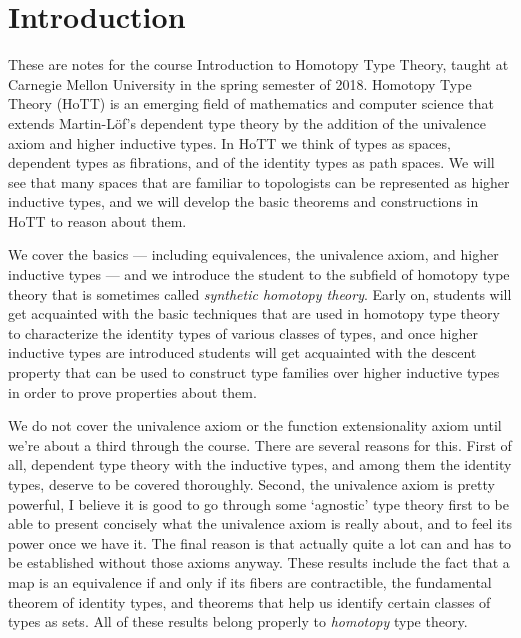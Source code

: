 \chapter{Introduction}
These are notes for the course Introduction to Homotopy Type Theory, taught at Carnegie Mellon University in the spring semester of 2018. Homotopy Type Theory (HoTT) is an emerging field of mathematics and computer science that extends Martin-Löf's dependent type theory by the addition of the univalence axiom and higher inductive types. In HoTT we think of types as spaces, dependent types as fibrations, and of the identity types as path spaces. We will see that many spaces that are familiar to topologists can be represented as higher inductive types, and we will develop the basic theorems and constructions in HoTT to reason about them.

We cover the basics --- including equivalences, the univalence axiom, and higher inductive types --- and we introduce the student to the subfield of homotopy type theory that is sometimes called \emph{synthetic homotopy theory}. Early on, students will get acquainted with the basic techniques that are used in homotopy type theory to characterize the identity types of various classes of types, and once higher inductive types are introduced students will get acquainted with the descent property that can be used to construct type families over higher inductive types in order to prove properties about them.

We do not cover the univalence axiom or the function extensionality axiom until we're about a third through the course. 
There are several reasons for this. 
First of all, dependent type theory with the inductive types, and among them the identity types, deserve to be covered thoroughly. 
Second, the univalence axiom is pretty powerful, I believe it is good to go through some `agnostic' type theory first to be able to present concisely what the univalence axiom is really about, and to feel its power once we have it. 
The final reason is that actually quite a lot can and has to be established without those axioms anyway. 
These results include the fact that a map is an equivalence if and only if its fibers are contractible, the fundamental theorem of identity types, and theorems that help us identify certain classes of types as sets.
All of these results belong properly to \emph{homotopy} type theory.

